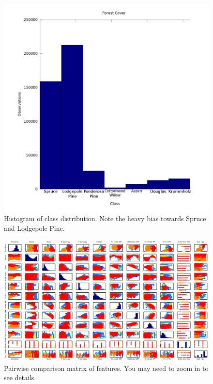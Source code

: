 \documentclass[12pt]{article}
\begin{document}
\begin{figure}[H]
\includegraphics[width=\linewidth]{images/description.png} 
\caption{Histogram of class distribution. Note the heavy bias towards Spruce and Lodgepole Pine.}
\end{figure}

\begin{figure}[H]
\includegraphics[width=\linewidth]{images/featureScatterPlotMatrixHD.png}
\caption{Pairwise comparison matrix of features. You may need to zoom in to see details.}
\end{figure}
\end{document}
